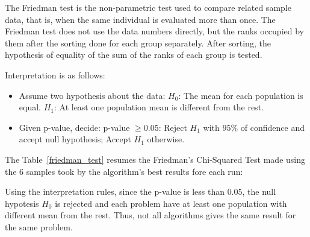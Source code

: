 The Friedman test is the non-parametric test used to compare related sample data, that is,
when the same individual is evaluated more than once.
The Friedman test does not use the data numbers directly, but the ranks occupied by
them after the sorting done for each group separately. After sorting, the hypothesis
of equality of the sum of the ranks of each group is tested.

Interpretation is as follows:
\begin{itemize}
    \item Assume two hypothesis about the data:
        \subitem $H_0$: The mean for each population is equal.
        \subitem $H_1$: At least one population mean is different from the rest.
    \item Given p-value, decide:
        \subitem p-value $\geq 0.05$: Reject $H_1$ with $95\%$ of confidence and accept null hypothesis;
        \subitem Accept $H_1$ otherwise.
\end{itemize}

The Table~\ref{friedman_test} resumes the Friedman's Chi-Squared Test made using
the 6 samples took by the algorithm's best results fore each run:

\begin{table}[H]
\centering
\caption{Significance Test Using Friedman Chi-Squared Test}
\label{friedman_test}
\end{table}

Using the interpretation rules, since the p-value is less than $0.05$, the null hypotesis $H_0$
is rejected and each problem have at least one population with different mean from the rest.
Thus, not all algorithms gives the same result for the same problem.

